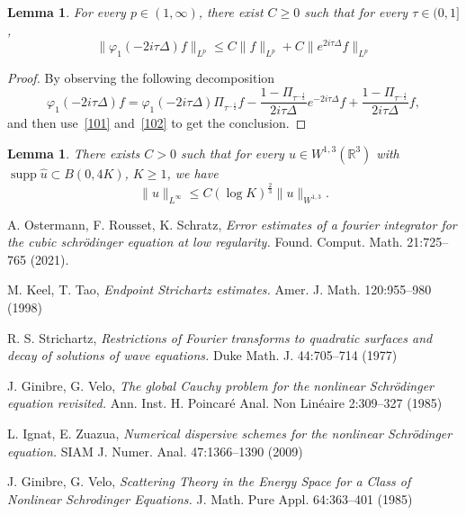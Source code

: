 \documentclass[10pt,a4paper]{article}
\newtheorem{lemma}[theorem]{Lemma}
\DeclareMathOperator{\supp}{supp}
\begin{document}
  \begin{lemma}
    For every \(p \in (1,\infty)\), there exist \(C \geq 0\) such that for every 
    \(\tau \in (0,1]\),
    \begin{equation}\label{decomp}
      \|\varphi_1(-2i\tau\Delta) f\|_{L^p} \leq C \|f\|_{L^p} + C
      \|e^{2i\tau\Delta}f\|_{L^p}
    \end{equation}
  \end{lemma}

  \begin{proof}
    By observing the following decomposition 
    \begin{equation}\label{phi1decomp}
      \varphi_1(-2i\tau\Delta) f = \varphi_1(-2i\tau\Delta)\Pi_{\tau^{-\frac12}} f
      - \frac{1 - \Pi_{\tau^{-\frac12}}}{2i\tau\Delta} e^{-2i\tau\Delta} f 
      + \frac{1 - \Pi_{\tau^{-\frac12}}}{2i\tau\Delta} f,
    \end{equation}
    and then use~\eqref{101} and~\eqref{102} to get the conclusion.
  \end{proof}

  \begin{lemma}\label{sobbord}
    There exists \(C>0\) such that for every \(u\in W^{1,3}(\mathbb R^3)\) with
    \(\supp \hat{u} \subset B(0,4K)\), \(K \geq 1\), we have
    \[ \|u\|_{L^\infty} \leq C (\log K)^\frac23 \|u\|_{W^{1,3}}. \]
  \end{lemma}

  \begin{thebibliography}{99}
      {\rm A. Ostermann, F. Rousset, K. Schratz,}
      {\em Error estimates of a fourier integrator for the cubic schr\"odinger equation at low regularity.}
      Found. Comput. Math. 21:725--765 (2021).

      {\rm M. Keel, T. Tao,}
      {\em Endpoint Strichartz estimates.}
      Amer. J. Math. 120:955--980 (1998)

      {\rm R. S. Strichartz,}
      {\em Restrictions of Fourier transforms to quadratic surfaces and decay of solutions of wave equations.}
      Duke Math. J. 44:705--714 (1977)

      {\rm J. Ginibre, G. Velo,}
      {\em The global Cauchy problem for the nonlinear Schr\"odinger equation revisited.}
      Ann. Inst. H. Poincar\'e Anal. Non Lin\'eaire 2:309--327 (1985)

      {\rm L. Ignat, E. Zuazua,}
      {\em Numerical dispersive schemes for the nonlinear Schr\"odinger equation.}
      SIAM J. Numer. Anal. 47:1366--1390 (2009)

      {\rm J. Ginibre, G. Velo,}
      {\em Scattering Theory in the Energy Space for a Class of Nonlinear Schrodinger Equations.}
      J. Math. Pure Appl. 64:363--401 (1985)
  \end{thebibliography}
\end{document}
